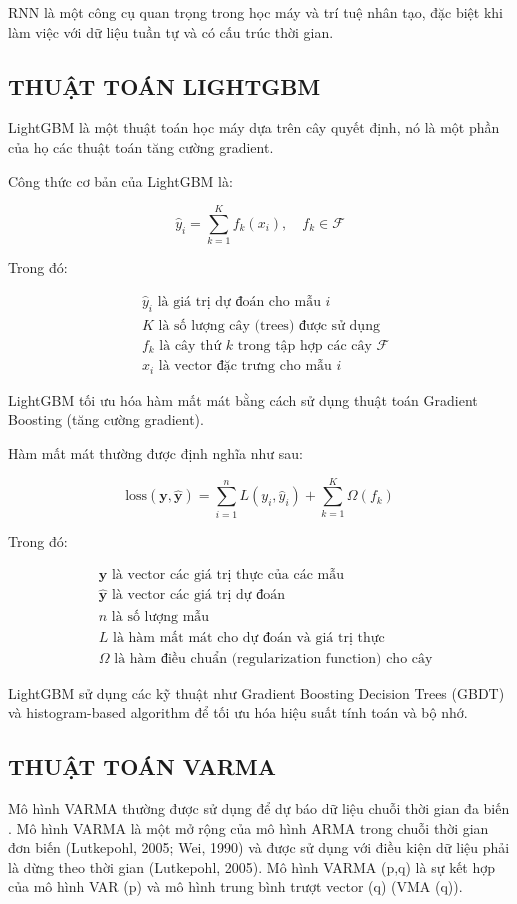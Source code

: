 \documentclass[conference]{IEEEtran}
\begin{document}
RNN là một công cụ quan trọng trong học máy và trí tuệ nhân tạo, đặc biệt khi làm việc với dữ liệu tuần tự và có cấu trúc thời gian.


\subsection{THUẬT TOÁN LIGHTGBM}

LightGBM là một thuật toán học máy dựa trên cây quyết định, nó là một phần của họ các thuật toán tăng cường gradient.

Công thức cơ bản của LightGBM là:

\[
\hat{y}_i = \sum_{k=1}^{K} f_k(x_i), \quad f_k \in \mathcal{F}
\]

Trong đó:

\begin{align*}
&\hat{y}_i \text{ là giá trị dự đoán cho mẫu } i \\
&K \text{ là số lượng cây (trees) được sử dụng} \\
&f_k \text{ là cây thứ } k \text{ trong tập hợp các cây } \mathcal{F} \\
&x_i \text{ là vector đặc trưng cho mẫu } i
\end{align*}

LightGBM tối ưu hóa hàm mất mát bằng cách sử dụng thuật toán Gradient Boosting (tăng cường gradient).

Hàm mất mát thường được định nghĩa như sau:

\[
\text{loss}(\mathbf{y}, \hat{\mathbf{y}}) = \sum_{i=1}^{n} L(y_i, \hat{y}_i) + \sum_{k=1}^{K} \Omega(f_k)
\]

Trong đó:

\begin{align*}
&\mathbf{y} \text{ là vector các giá trị thực của các mẫu} \\
&\hat{\mathbf{y}} \text{ là vector các giá trị dự đoán} \\
&n \text{ là số lượng mẫu} \\
&L \text{ là hàm mất mát cho dự đoán và giá trị thực} \\
&\Omega \text{ là hàm điều chuẩn (regularization function) cho cây}
\end{align*}

LightGBM sử dụng các kỹ thuật như Gradient Boosting Decision Trees (GBDT) và histogram-based algorithm để tối ưu hóa hiệu suất tính toán và bộ nhớ.
\subsection{THUẬT TOÁN VARMA}
Mô hình VARMA thường được sử dụng để dự báo dữ liệu chuỗi thời gian đa biến . Mô hình VARMA là một mở rộng của mô hình ARMA trong chuỗi thời gian đơn biến (Lutkepohl, 2005; Wei, 1990) và được sử dụng với điều kiện dữ liệu phải là dừng theo thời gian (Lutkepohl, 2005). Mô hình VARMA (p,q) là sự kết hợp của mô hình VAR (p) và mô hình trung bình trượt vector (q) (VMA (q)).\\
 
\end{document}

